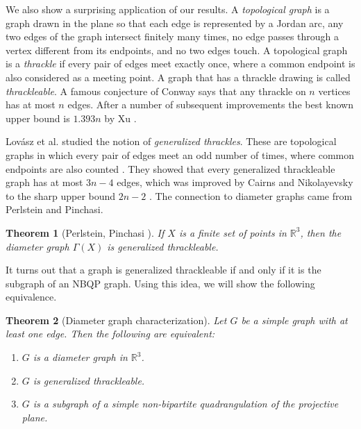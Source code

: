 \documentclass[10pt,a4paper]{article}
\newtheorem{theorem}{Theorem}[section]
\newcommand{\R}[0]{\mathbb{R}}
\begin{document}
We also show a surprising application of our results. A \emph{topological graph} is a graph drawn in the plane so that each edge is represented by a Jordan arc, any two edges of the graph intersect finitely many times, no edge passes through a vertex different from its endpoints, and no two edges touch. A  topological graph is a \emph{thrackle} if  every pair of edges meet exactly once, where a common endpoint is also considered as a meeting point. A graph that has a thrackle drawing is called \emph{thrackleable}. A famous conjecture of Conway says that any thrackle on $n$ vertices has at most $n$ edges. After a number of subsequent improvements \cite{lovasz1997conway,CN00,fulek2011computational} the best known upper bound is $1.393n$ by Xu \cite{xu2021new}. 

Lovász et al. studied the notion of \emph{generalized thrackles}. These are topological graphs in which every pair of edges meet an odd number of times, where common endpoints are also counted \cite{lovasz1997conway}. They showed that every generalized thrackleable graph has at most $3n-4$ edges, which was improved by Cairns and Nikolayevsky to the sharp upper bound $2n-2$ \cite{CN00}. The connection to diameter graphs came from Perlstein and Pinchasi. 


\begin{theorem}[Perlstein, Pinchasi \cite{ROM08}]\label{thm:diamisgent}
    If $X$ is a finite set of points in $\mathbb{R}^3$, then the diameter graph $\Gamma(X)$ is generalized thrackleable.
\end{theorem}

It turns out that a graph is generalized thrackleable if and only if it is the subgraph of an NBQP graph. Using this idea, we will show the following equivalence. 

\begin{theorem}[Diameter graph characterization]\label{thm:main_thrackleable}
    Let $G$ be a simple graph with at least one edge. Then the following are equivalent:
    \begin{enumerate}
        \item[a)] $G$ is a diameter graph in $\R^3$.
        \item[b)] $G$ is generalized thrackleable.
        \item[c)] $G$ is a subgraph of a simple non-bipartite quadrangulation of the projective plane.
    \end{enumerate}
     
\end{theorem}
\end{document}

